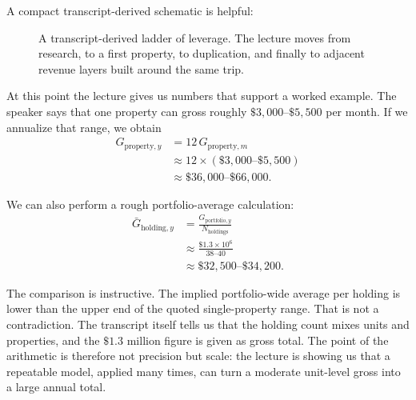 A compact transcript-derived schematic is helpful:

\begin{figure}[t]
\centering
{}
\caption{A transcript-derived ladder of leverage. The lecture moves from research, to a first property, to duplication, and finally to adjacent revenue layers built around the same trip.}
\end{figure}

At this point the lecture gives us numbers that support a worked example. The speaker says that one property can gross roughly \(\$3{,}000\text{--}\$5{,}500\) per month. If we annualize that range, we obtain
\begin{align}
G_{\mathrm{property},y}
&= 12\,G_{\mathrm{property},m} \\
&\approx 12\times (\$3{,}000\text{--}\$5{,}500) \\
&\approx \$36{,}000\text{--}\$66{,}000.
\end{align}

We can also perform a rough portfolio-average calculation:
\begin{align}
\bar G_{\mathrm{holding},y}
&= \frac{G_{\mathrm{portfolio},y}}{N_{\mathrm{holdings}}} \\
&\approx \frac{\$1.3\times 10^6}{38\text{--}40} \\
&\approx \$32{,}500\text{--}\$34{,}200.
\end{align}

The comparison is instructive. The implied portfolio-wide average per holding is lower than the upper end of the quoted single-property range. That is not a contradiction. The transcript itself tells us that the holding count mixes units and properties, and the \(\$1.3\) million figure is given as gross total. The point of the arithmetic is therefore not precision but scale: the lecture is showing us that a repeatable model, applied many times, can turn a moderate unit-level gross into a large annual total.

